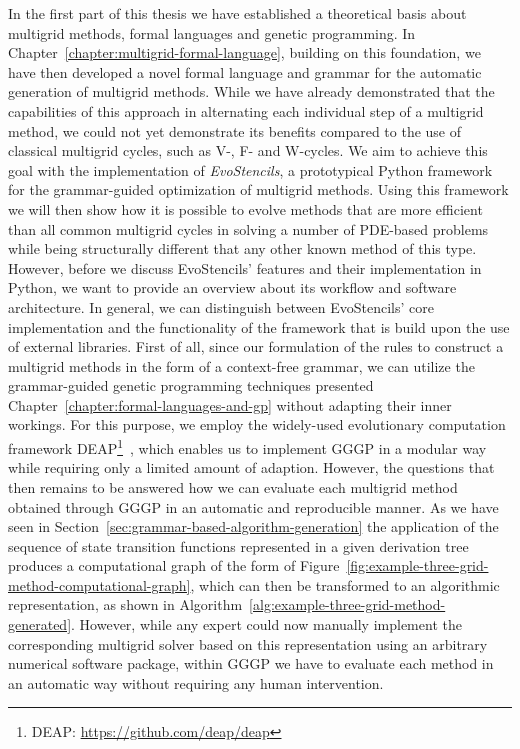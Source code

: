 In the first part of this thesis we have established a theoretical basis about multigrid methods, formal languages and genetic programming.
In Chapter~\ref{chapter:multigrid-formal-language}, building on this foundation, we have then developed a novel formal language and grammar for the automatic generation of multigrid methods. 
While we have already demonstrated that the capabilities of this approach in alternating each individual step of a multigrid method, we could not yet demonstrate its benefits compared to the use of classical multigrid cycles, such as V-, F- and W-cycles.
We aim to achieve this goal with the implementation of \emph{EvoStencils}, a prototypical Python framework for the grammar-guided optimization of multigrid methods.
Using this framework we will then show how it is possible to evolve methods that are more efficient than all common multigrid cycles in solving a number of PDE-based problems while being structurally different that any other known method of this type.
However, before we discuss EvoStencils' features and their implementation in Python, we want to provide an overview about its workflow and software architecture.
In general, we can distinguish between EvoStencils' core implementation and the functionality of the framework that is build upon the use of external libraries.
First of all, since our formulation of the rules to construct a multigrid methods in the form of a context-free grammar, we can utilize the grammar-guided genetic programming techniques presented Chapter~\ref{chapter:formal-languages-and-gp} without adapting their inner workings.
For this purpose, we employ the widely-used evolutionary computation framework DEAP\footnote{DEAP: \url{https://github.com/deap/deap}}~\cite{rainville2012deap}, which enables us to implement GGGP in a modular way while requiring only a limited amount of adaption.
However, the questions that then remains to be answered how we can evaluate each multigrid method obtained through GGGP in an automatic and reproducible manner.
As we have seen in Section~\ref{sec:grammar-based-algorithm-generation} the 
application of the sequence of state transition functions represented in a given derivation tree produces a computational graph of the form of Figure~\ref{fig:example-three-grid-method-computational-graph}, which can then be transformed to an algorithmic representation, as shown in Algorithm~\ref{alg:example-three-grid-method-generated}.
However, while any expert could now manually implement the corresponding multigrid solver based on this representation using an arbitrary numerical software package, within GGGP we have to evaluate each method in an automatic way without requiring any human intervention.
